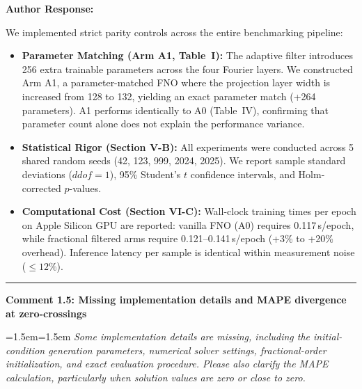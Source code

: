 \documentclass[11pt,a4paper]{article}
\newcommand{\revcomment}[2]{%
  \vspace{3mm}\par\noindent
  \textbf{\color{navyblue}#1}\par\vspace{1.5mm}
  \begingroup
  \leftskip=1.5em\rightskip=1.5em
  \small\itshape\color{commentgray}
  #2\par
  \endgroup
  \vspace{2mm}
}
\newenvironment{authorresponse}{%
  \vspace{1mm}\par\noindent
  \textbf{\color{navyblue}Author Response:}\par\vspace{1.5mm}
}{%
  \vspace{3mm}\par\noindent\rule{\textwidth}{0.3pt}\vspace{2mm}
}
\begin{document}
\begin{authorresponse}
We implemented strict parity controls across the entire benchmarking pipeline:
\begin{itemize}
  \item \textbf{Parameter Matching (Arm A1, Table~I):} The adaptive filter introduces 256 extra trainable parameters across the four Fourier layers. We constructed Arm A1, a parameter-matched FNO where the projection layer width is increased from 128 to 132, yielding an exact parameter match (+264 parameters). A1 performs identically to A0 (Table~IV), confirming that parameter count alone does not explain the performance variance.
  \item \textbf{Statistical Rigor (Section V-B):} All experiments were conducted across 5 shared random seeds (42, 123, 999, 2024, 2025). We report sample standard deviations ($ddof=1$), 95\% Student's $t$ confidence intervals, and Holm-corrected $p$-values.
  \item \textbf{Computational Cost (Section VI-C):} Wall-clock training times per epoch on Apple Silicon GPU are reported: vanilla FNO (A0) requires 0.117\,s/epoch, while fractional filtered arms require 0.121--0.141\,s/epoch (+3\% to +20\% overhead). Inference latency per sample is identical within measurement noise ($\le 12\%$).
\end{itemize}
\end{authorresponse}

\revcomment{Comment 1.5: Missing implementation details and MAPE divergence at zero-crossings}{Some implementation details are missing, including the initial-condition generation parameters, numerical solver settings, fractional-order initialization, and exact evaluation procedure. Please also clarify the MAPE calculation, particularly when solution values are zero or close to zero.}
\end{document}
